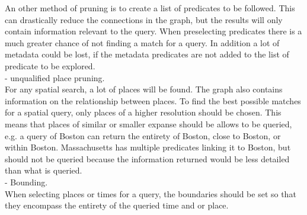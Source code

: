 An other method of pruning is to create a list of predicates to be followed. This can drastically reduce the connections in the graph, but the results will only contain information relevant to the query. When preselecting predicates there is a much greater chance of not finding a match for a query. In addition a lot of metadata could be lost, if the metadata predicates are not added to the list of predicate to be explored.\\

- unqualified place pruning.\\
For any spatial search, a lot of places will be found. The graph also contains information on the relationship between places. To find the best possible matches for a spatial query, only places of a higher resolution should be chosen. This means that places of similar or smaller expanse should be allows to be queried, e.g. a query of Boston can return the entirety of Boston, close to Boston, or within Boston. Massachusetts has multiple predicates linking it to Boston, but should not be queried because the information returned would be less detailed than what is queried. \\

- Bounding.\\
When selecting places or times for a query, the boundaries should be set so that they encompass the entirety of the queried time and or place.\\

\clearpage